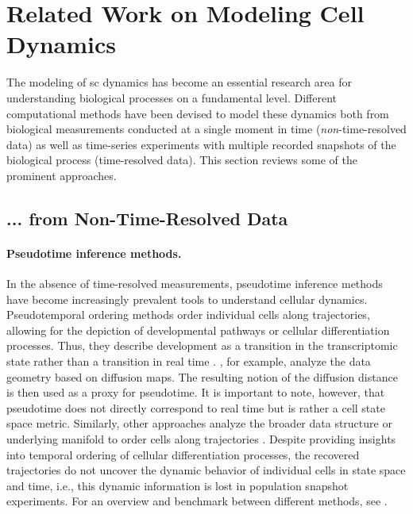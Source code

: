 \section{Related Work on Modeling Cell Dynamics}
\label{sec:related_work_bio}

The modeling of \acrlong{sc} dynamics has become an essential research area for understanding biological processes on a fundamental level. Different computational methods have been devised to model these dynamics both from biological measurements conducted at a single moment in time (\textit{non}-time-resolved data) as well as time-series experiments with multiple recorded snapshots of the biological process (time-resolved data). This section reviews some of the prominent approaches. 

\subsection*{... from Non-Time-Resolved Data}

\paragraph{Pseudotime inference methods.}

In the absence of time-resolved measurements, pseudotime inference methods have become increasingly prevalent tools to understand cellular dynamics.
Pseudotemporal ordering methods order individual cells along trajectories, allowing for the depiction of developmental pathways or cellular differentiation processes. Thus, they describe development as a transition in the transcriptomic state rather than a transition in real time \citep{trapnell2014dynamics}. \citet{haghverdi2016diffusion}, for example, analyze the data geometry based on diffusion maps. The resulting notion of the diffusion distance is then used as a proxy for pseudotime. 
It is important to note, however, that pseudotime does not directly correspond to real time but is rather a cell state space metric.
Similarly, other approaches analyze the broader data structure or underlying manifold to order cells along trajectories \citep{qiu2017reversed, wolf2019paga, saelens2019comparison, setty2019characterization}. Despite providing insights into temporal ordering of cellular differentiation processes, the recovered trajectories do not uncover the dynamic behavior of individual cells in state space and time, i.e., this dynamic information is lost in population snapshot experiments. 
For an overview and benchmark between different methods, see \citet{saelens2019comparison, tritschler2019concepts}.

